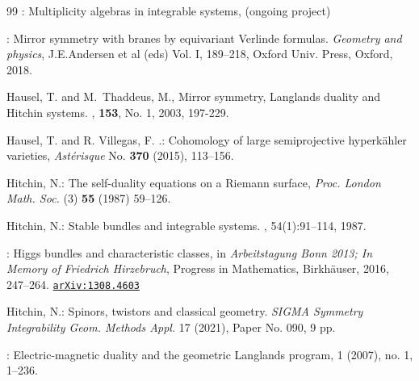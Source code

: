 \begin{thebibliography}{99}
	: Multiplicity algebras in integrable systems, (ongoing project)
	
	:
	Mirror symmetry with branes by equivariant Verlinde formulas. {\em Geometry and physics}, J.E.Andersen et al (eds) Vol. I, 189--218,  Oxford Univ. Press, Oxford, 2018.
	
	 { Hausel, T. {\rm and} M.~Thaddeus, M.},
	\newblock Mirror symmetry, {L}anglands duality and {H}itchin systems.
	, {\bf 153}, No. 1, 2003, 197-229. %
	
	 { Hausel,  T. {\rm and}  R. Villegas, F. .}:
	Cohomology of large semiprojective hyperk\"ahler varieties, 
	{\em Ast\'erisque} No. {\bf 370} (2015), 113--156. %
	
	 {   Hitchin, N.}: { The self-duality equations on a Riemann 
		surface}, {\em Proc. London Math. Soc.} (3) {\bf 55} (1987) 59--126.
	
	
	
	{ Hitchin, N.}:
	\newblock Stable bundles and integrable systems.
	, 54(1):91--114, 1987.
	
	: Higgs bundles and characteristic classes, in {
		\em Arbeitstagung Bonn 2013; In Memory of Friedrich Hirzebruch}, Progress in Mathematics, Birkh\"auser, 2016, 247--264. \href{https://arxiv.org/abs/1308.4603}{\tt arXiv:1308.4603}
	
	 Hitchin, N.:
Spinors, twistors and classical geometry. 
{\em SIGMA Symmetry Integrability Geom. Methods Appl.} 17 (2021), Paper No. 090, 9 pp.
	
	
	:
	\newblock Electric-magnetic duality and the geometric {L}anglands program,   1  (2007),  no. 1, 1--236. 
	
	

\end{thebibliography}
